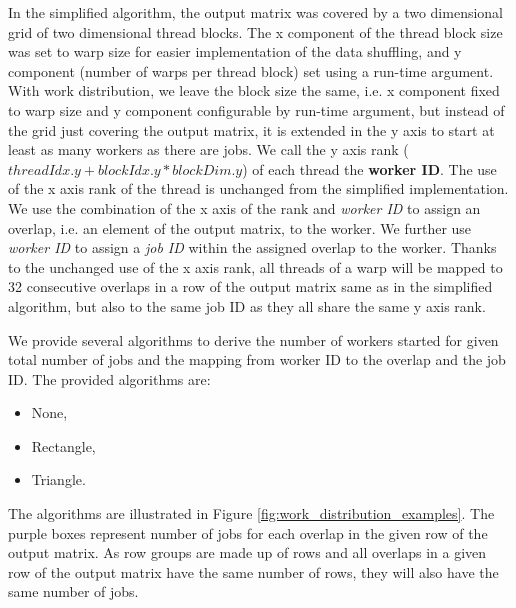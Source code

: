 In the simplified algorithm, the output matrix was covered by a two dimensional grid of two dimensional thread blocks. The x component of the thread block size was set to warp size for easier implementation of the data shuffling, and y component (number of warps per thread block) set using a run-time argument. With work distribution, we leave the block size the same, i.e. x component fixed to warp size and y component configurable by run-time argument, but instead of the grid just covering the output matrix, it is extended in the y axis to start at least as many workers as there are jobs. We call the y axis rank ($threadIdx.y + blockIdx.y * blockDim.y$) of each thread the \textbf{worker ID}. The use of the x axis rank of the thread is unchanged from the simplified implementation. We use the combination of the x axis of the rank and \textit{worker ID} to assign an overlap, i.e. an element of the output matrix, to the worker. We further use \textit{worker ID} to assign a \textit{job ID} within the assigned overlap to the worker. Thanks to the unchanged use of the x axis rank, all threads of a warp will be mapped to 32 consecutive overlaps in a row of the output matrix same as in the simplified algorithm, but also to the same job ID as they all share the same y axis rank.

We provide several algorithms to derive the number of workers started for given total number of jobs and the mapping from worker ID to the overlap and the job ID. The provided algorithms are:

\begin{itemize}
	\item None,
	\item Rectangle,
	\item Triangle.
\end{itemize}


The algorithms are illustrated in Figure \ref{fig:work_distribution_examples}. The purple boxes represent number of jobs for each overlap in the given row of the output matrix. As row groups are made up of rows and all overlaps in a given row of the output matrix have the same number of rows, they will also have the same number of jobs.

